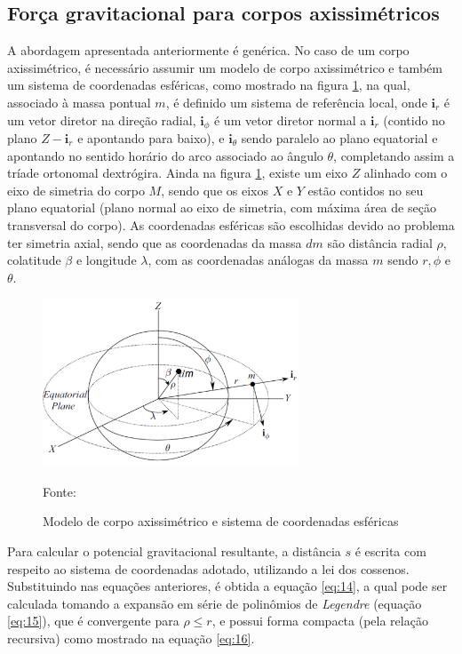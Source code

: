 \subsection{Força gravitacional para corpos axissimétricos}

A abordagem apresentada anteriormente é genérica. No caso de um corpo axissimétrico, é necessário assumir um modelo de corpo axissimétrico e também um sistema de coordenadas esféricas, como mostrado na figura \ref{fig:axis}, na qual, associado à massa pontual $m$, é definido um sistema de referência local, onde $\textbf{i}_{r}$ é um vetor diretor na direção radial, $\textbf{i}_{\phi}$ é um vetor diretor normal a $\textbf{i}_{r}$ (contido no plano $Z - \textbf{i}_{r}$ e apontando para baixo), e $\textbf{i}_{\theta}$ sendo paralelo ao plano equatorial e apontando no sentido horário do arco associado ao ângulo $\theta$, completando assim a tríade ortonomal dextrógira. Ainda na figura \ref{fig:axis}, existe um eixo $Z$ alinhado com o eixo de simetria do corpo $M$, sendo que os eixos $X$ e $Y$ estão contidos no seu plano equatorial (plano normal ao eixo de simetria, com máxima área de seção transversal do corpo). As coordenadas esféricas são escolhidas devido ao problema ter simetria axial, sendo que as coordenadas da massa $dm$ são distância radial $\rho$, colatitude $\beta$ e longitude $\lambda$, com as coordenadas análogas da massa $m$ sendo $r, \phi$ e $\theta$.

\begin{figure}[h]
        \centering
        \includegraphics[width=3in]{figuras/axis.png}
        \caption{Modelo de corpo axissimétrico e sistema de coordenadas esféricas}
        \footnotesize Fonte: \cite{livro:andre}
        \label{fig:axis}
\end{figure} 


Para calcular o potencial gravitacional resultante, a distância $s$ é escrita com respeito ao sistema de coordenadas adotado, utilizando a lei dos cossenos. Substituindo nas equações anteriores, é obtida a equação \ref{eq:14}, a qual pode ser calculada tomando a expansão em série de polinômios de \textit{Legendre} (equação \ref{eq:15}), que é convergente para $\rho \leq r$, e possui forma compacta (pela relação recursiva) como mostrado na equação \ref{eq:16}.

